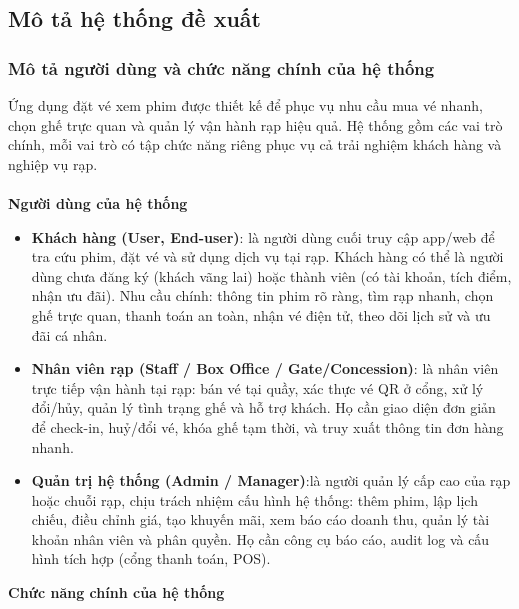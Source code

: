 \documentclass[a4paper]{article}
\newcommand{\cach}{\hspace*{1.5em}\ignorespaces}
\begin{document}
\subsection{Mô tả hệ thống đề xuất}
\subsubsection{Mô tả người dùng và chức năng chính của hệ thống}
\cach Ứng dụng đặt vé xem phim được thiết kế để phục vụ nhu cầu mua vé nhanh, chọn ghế trực quan và quản lý vận hành rạp hiệu quả. Hệ thống gồm các vai trò chính, mỗi vai trò có tập chức năng riêng phục vụ cả trải nghiệm khách hàng và nghiệp vụ rạp.
\\
\\
\cach \textbf{Người dùng của hệ thống}
\begin{itemize}
	\item \textbf{Khách hàng (User, End-user)}: là người dùng cuối truy cập app/web để tra cứu phim, đặt vé và sử dụng dịch vụ tại rạp. Khách hàng có thể là người dùng chưa đăng ký (khách vãng lai) hoặc thành viên (có tài khoản, tích điểm, nhận ưu đãi). Nhu cầu chính: thông tin phim rõ ràng, tìm rạp nhanh, chọn ghế trực quan, thanh toán an toàn, nhận vé điện tử, theo dõi lịch sử và ưu đãi cá nhân.
	\item \textbf{Nhân viên rạp (Staff / Box Office / Gate/Concession)}: là nhân viên trực tiếp vận hành tại rạp: bán vé tại quầy, xác thực vé QR ở cổng, xử lý đổi/hủy, quản lý tình trạng ghế và hỗ trợ khách. Họ cần giao diện đơn giản để check-in, huỷ/đổi vé, khóa ghế tạm thời, và truy xuất thông tin đơn hàng nhanh.
	\item \textbf{Quản trị hệ thống (Admin / Manager)}:là người quản lý cấp cao của rạp hoặc chuỗi rạp, chịu trách nhiệm cấu hình hệ thống: thêm phim, lập lịch chiếu, điều chỉnh giá, tạo khuyến mãi, xem báo cáo doanh thu, quản lý tài khoản nhân viên và phân quyền. Họ cần công cụ báo cáo, audit log và cấu hình tích hợp (cổng thanh toán, POS).
\end{itemize}
\cach \textbf{Chức năng chính của hệ thống}
\end{document}
